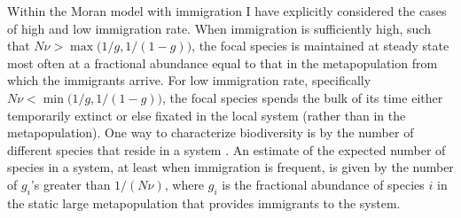 Within the Moran model with immigration I have explicitly considered the cases of high and low immigration rate. 
When immigration is sufficiently high, such that $N\nu > \max\big(1/g,1/(1-g)\big)$, the focal species is maintained at steady state most often at a fractional abundance equal to that in the metapopulation from which the immigrants arrive. 
For low immigration rate, specifically $N\nu < \min\big(1/g,1/(1-g)\big)$, the focal species spends the bulk of its time either temporarily extinct or else fixated in the local system (rather than in the metapopulation). 
One way to characterize biodiversity is by the number of different species that reside in a system \cite{May1999,Hubbell2001,others?,Chesson2000?}. 
An estimate of the expected number of species in a system, at least when immigration is frequent, is given by the number of $g_i$'s greater than $1/(N\nu)$, where $g_i$ is the fractional abundance of species $i$ in the static large metapopulation that provides immigrants to the system. %


